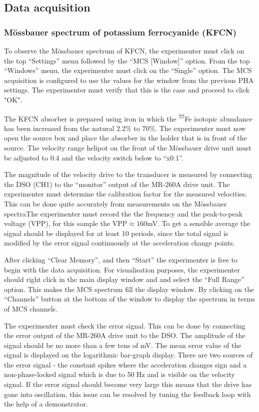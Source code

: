 \documentclass[a4paper, twocolumn]{article}
\begin{document}
\subsection{Data acquisition}
\subsubsection{Mössbauer spectrum of potassium ferrocyanide (KFCN)}
To observe the Mössbauer spectrum of KFCN, the experimenter must click on the top “Settings” menu followed by the “MCS [Window]” option.
From the top “Windows” menu, the experimenter must click on the “Single” option. The MCS acquisition is configured to use the values for the window from the previous PHA settings\cite{0}. The experimenter must verify that this is the case and proceed to click "OK".

The KFCN absorber is prepared using iron in which the \textsuperscript{57}Fe isotopic abundance has been increased from the natural $2.2\%$ to $70\%$\cite{0}. 
The experimenter must now open the source box and place the absorber in the holder that is in front of the source\cite{0}. The velocity range helipot on the front of the Mössbauer drive unit must be adjusted to 0.4 and the velocity switch below to “x0.1”\cite{0}. 

The magnitude of the velocity drive to the transducer is measured by connecting the DSO (CH1) to the “monitor” output of the MR-260A drive unit\cite{0}. The experimenter must determine the calibration factor for the measured velocities. This can be done quite accurately from measurements on the Mössbauer spectra\cite{0}The experimenter must record the the frequency and the peak-to-peak voltage (VPP), for this sample the $\textrm{VPP} \approx 160$mV. To get a sensible average the signal should be displayed for at least 10 periods, since the total signal is modified by the error signal continuously at the acceleration change points\cite{0}.

After clicking “Clear Memory”, and then “Start” the experimenter is free to begin with the data acquisition. 
For visualisation purposes, the experimenter should right click in the main display window and and select the “Full Range” option. This makes the MCS spectrum fill the display window. By clicking on the “Channels” button at the bottom of the window to display the spectrum in terms of MCS channels\cite{0}. 

The experimenter must check the error signal. This can be done by connecting the error output of the MR-260A drive unit to the DSO. The amplitude of the signal should be no more than a few tens of mV\cite{0}. The mean error value of the signal is displayed on the logarithmic bar-graph display. There are two sources of the error signal - the constant spikes where the acceleration changes sign and a non-phase-locked signal which is due to 50 Hz and is visible on the velocity signal\cite{0}. If the error signal should become very large this means that the drive has gone into oscillation, this issue can be resolved by tuning the feedback loop with the help of a demonstrator.
\end{document}
